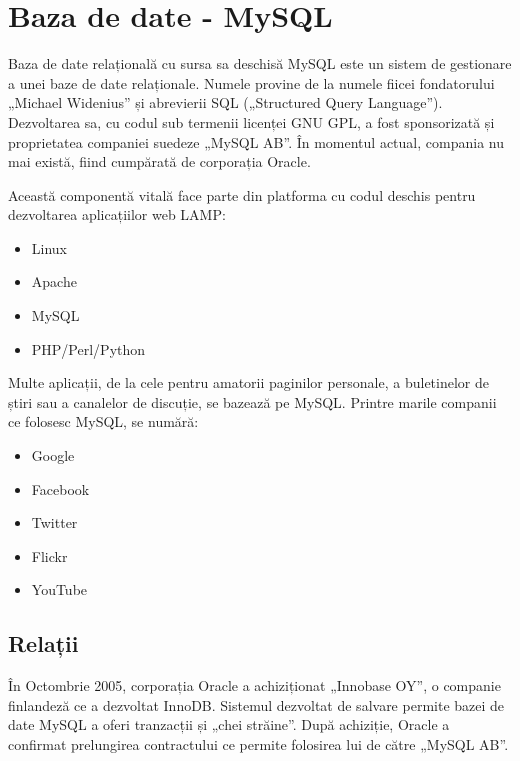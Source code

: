 \section{Baza de date - MySQL}

	Baza de date relațională cu sursa sa deschisă MySQL este un sistem de gestionare a unei baze de date relaționale.
	Numele provine de la numele fiicei fondatorului „Michael Widenius”\cite{mysql_reference} și abrevierii SQL („Structured Query Language”).
	Dezvoltarea sa, cu codul sub termenii licenței GNU GPL, a fost sponsorizată și proprietatea companiei suedeze „MySQL AB”.
	În momentul actual, compania nu mai există, fiind cumpărată de corporația Oracle.

	Această componentă vitală face parte din platforma cu codul deschis pentru dezvoltarea aplicațiilor web LAMP:
	\begin{itemize}
		\item Linux
		\item Apache
		\item MySQL
		\item PHP/Perl/Python
	\end{itemize}
	Multe aplicații, de la cele pentru amatorii paginilor personale, a buletinelor de știri sau a canalelor de discuție, se bazează pe MySQL.
	Printre marile companii ce folosesc MySQL, se numără:
	\begin{itemize}
		\item Google
		\item Facebook
		\item Twitter
		\item Flickr
		\item YouTube
	\end{itemize}


	\subsection{Relații}

	În Octombrie 2005, corporația Oracle a achiziționat „Innobase OY”, o companie finlandeză ce a dezvoltat InnoDB. \cite{innodb}
	Sistemul dezvoltat de salvare permite bazei de date MySQL a oferi tranzacții și „chei străine”.
	După achiziție, Oracle a confirmat prelungirea contractului ce permite folosirea lui de către „MySQL AB”.

